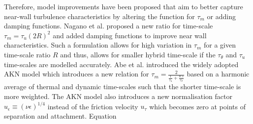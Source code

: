 Therefore, model improvements have been proposed that aim to better capture near-wall turbulence characteristics by altering the function for $\tau_{m}$ or adding damping functions. Nagano et al. \cite{Nagano1991} proposed a new ratio for time-scale $\tau_{m} = \tau_{u}(2R)^{2}$ and added damping functions to improve near wall characteristics. Such a formulation allows for high variation in $\tau_{m}$ for a given time-scale ratio $R$ and thus, allows for smaller hybrid time-scale if the $\tau_{\theta}$ and $\tau_{u}$ time-scales are modelled accurately. Abe et al. \cite{Abe1995} introduced the widely adopted AKN model which introduces a new relation for $\tau_{m} = \frac{2}{\frac{1}{\tau_{u}} + \frac{0.5}{\tau_{\theta}}}$ based on a harmonic average of thermal and dynamic time-scales such that the shorter time-scale is more weighted. The AKN model also introduces a new normalisation factor $u_{\epsilon} \equiv \left(\nu \epsilon\right)^{1/4}$ instead of the friction velocity $u_{\tau}$ which becomes zero at points of separation and attachment. Equation 

